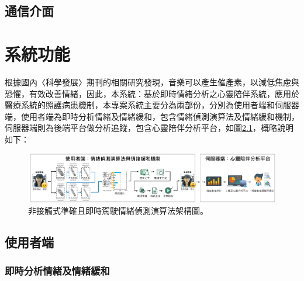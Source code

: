 \documentclass[12pt]{scrreprt}
\begin{document}
\section{通信介面} %

\chapter{系統功能}
根據國內〈科學發展〉期刊的相關研究發現，音樂可以產生催產素，以減低焦慮與恐懼，有效改善情緒，因此，本系統：基於即時情緒分析之心靈陪伴系統，應用於醫療系統的照護病患機制，本專案系統主要分為兩部份，分別為使用者端和伺服器端，使用者端為即時分析情緒及情緒緩和，包含情緒偵測演算法及情緒緩和機制，伺服器端則為後端平台做分析追蹤，包含心靈陪伴分析平台，如圖\ref{fig:framework}，概略說明如下：

\begin{figure}[!h]
\begin{center}
\includegraphics[width=1\textwidth]{./figs/framework-version2.pdf}
\end{center}
\caption{非接觸式準確且即時駕駛情緒偵測演算法架構圖。}
\label{fig:framework}
\end{figure}

\section{使用者端}

\subsection{即時分析情緒及情緒緩和}
\end{document}
